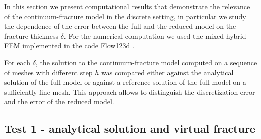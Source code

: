 \documentclass{llncs}
\def\norm#1{\|#1\|}
\begin{document}
In this section we present computational results that demonstrate the relevance of the continuum-fracture model
in the discrete setting, in particular we study the dependence of the error between the full and the reduced model 
on the fracture thickness $\delta$.
For the numerical computation we used the mixed-hybrid FEM implemented in the code Flow123d \cite{flow123d}.

For each $\delta$, the solution to the continuum-fracture model computed on a sequence
of meshes with different step $h$ was compared either against the analytical solution of the full model 
or against a reference solution of the full model on a sufficiently fine mesh. 
This approach allows to distinguish the discretization error and the error of the reduced model.



\subsection{Test 1 - analytical solution and virtual fracture}
\end{document}

